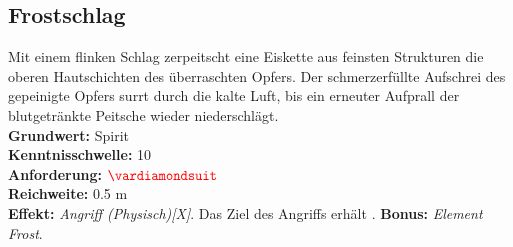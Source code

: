 \subsection*{Frostschlag} \label{sk:frostschlag}
Mit einem flinken Schlag zerpeitscht eine Eiskette aus feinsten Strukturen die oberen Hautschichten des überraschten Opfers. Der schmerzerfüllte Aufschrei des gepeinigte Opfers surrt durch die kalte Luft, bis ein erneuter Aufprall der blutgetränkte Peitsche wieder niederschlägt.\\
\textbf{Grundwert:} Spirit\\
\textbf{Kenntnisschwelle:} 10 \\
\textbf{Anforderung:} $\Karo{}$ \\
\textbf{Reichweite:} 0.5 m \\
\textbf{Effekt:} \textit{Angriff (Physisch)[X]}. Das Ziel des Angriffs erhält \textit{}. \textbf{Bonus:} \textit{Element Frost}.

